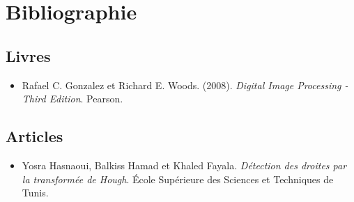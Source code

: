 \documentclass[12pt,titlepage]{article}
\begin{document}


\section{Bibliographie}

\subsection{Livres}
\sloppy
\begin{itemize}
\item Rafael C. Gonzalez et Richard E. Woods. (2008). \textit{Digital Image Processing - Third Edition}. Pearson.
\end{itemize}

\subsection{Articles}
\sloppy
\begin{itemize}
\item Yosra Hasnaoui, Balkiss Hamad et Khaled Fayala. \textit{Détection des droites par la transformée de Hough}. École Supérieure des Sciences et Techniques de Tunis.
\end{itemize}
\end{document}
